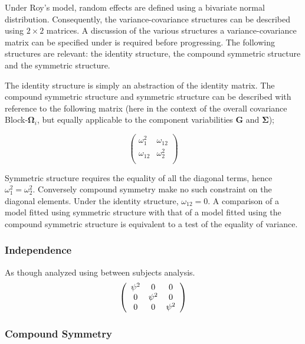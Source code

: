 \documentclass[12pt, a4paper]{article}
\theoremstyle{plain}
\theoremstyle{definition}
\theoremstyle{remark}
\begin{document}
	Under Roy's model, random effects are defined using a bivariate normal distribution. Consequently, the variance-covariance structures can be described using $2 \times 2$  matrices. A discussion of the various structures a variance-covariance matrix can be specified under is required before progressing. The following structures are relevant: the identity structure, the compound symmetric structure and the symmetric structure.
	
	The identity structure is simply an abstraction of the identity matrix. The compound symmetric structure and symmetric structure can be described with reference to the following matrix (here in the context of the overall covariance Block-$\boldsymbol{\Omega}_i$, but equally applicable to the component variabilities $\boldsymbol{G}$ and $\boldsymbol{\Sigma}$);
	
	\[\left( \begin{array}{cc}
	\omega^2_1  & \omega_{12} \\
	\omega_{12} & \omega^2_2 \\
	\end{array}\right) \]
	
	Symmetric structure requires the equality of all the diagonal terms, hence $\omega^2_1 = \omega^2_2$. Conversely compound symmetry make no such constraint on the diagonal elements. Under the identity structure, $\omega_{12} = 0$.
	A comparison of a model fitted using symmetric structure with that of a model fitted using the compound symmetric structure is equivalent to a test of the equality of variance.
	
	
	
	

	
	\subsubsection*{Independence}
	
	As though analyzed using between subjects analysis.
	\[
	\left(
	\begin{array}{c c c}
	\psi^2 & 0 & 0   \\
	0 & \psi^2 & 0   \\
	0 & 0 & \psi^2   \\
	\end{array}%
	\right)
	\]
	
	
	\subsubsection*{Compound Symmetry}
	
\end{document}

